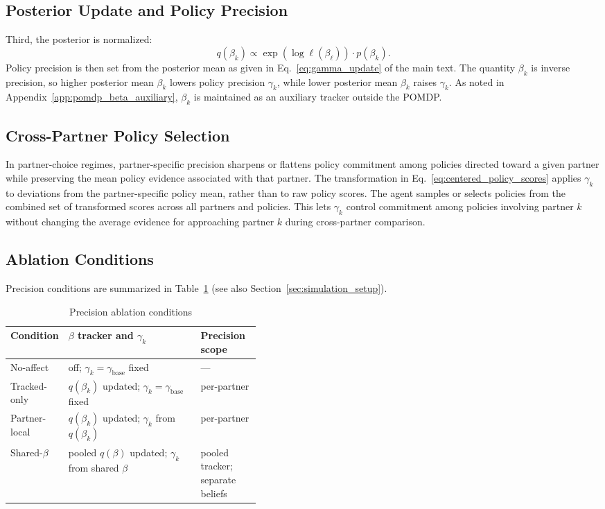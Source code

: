 \documentclass[runningheads,orivec]{llncs}
\begin{document}
\subsection{Posterior Update and Policy Precision}

Third, the posterior is normalized:
\begin{equation}
q(\beta_k) \propto \exp(\log \ell(\beta_\ell)) \cdot p(\beta_k).
\label{eq:posterior_update}
\end{equation}
Policy precision is then set from the posterior mean as given in Eq.~\eqref{eq:gamma_update} of the main text. The quantity $\beta_k$ is inverse precision, so higher posterior mean $\beta_k$ lowers policy precision $\gamma_k$, while lower posterior mean $\beta_k$ raises $\gamma_k$. As noted in Appendix~\ref{app:pomdp_beta_auxiliary}, $\beta_k$ is maintained as an auxiliary tracker outside the POMDP.

\subsection{Cross-Partner Policy Selection}

In partner-choice regimes, partner-specific precision sharpens or flattens policy commitment among policies directed toward a given partner while preserving the mean policy evidence associated with that partner. The transformation in Eq.~\eqref{eq:centered_policy_scores} applies $\gamma_k$ to deviations from the partner-specific policy mean, rather than to raw policy scores. The agent samples or selects policies from the combined set of transformed scores across all partners and policies. This lets $\gamma_k$ control commitment among policies involving partner $k$ without changing the average evidence for approaching partner $k$ during cross-partner comparison.

\subsection{Ablation Conditions}

Precision conditions are summarized in Table~\ref{tab:precision_variants} (see also Section~\ref{sec:simulation_setup}).

\begin{table}[H]
\centering
\small
\caption{Precision ablation conditions}
\label{tab:precision_variants}
\begin{tabularx}{\linewidth}{@{}>{\raggedright\arraybackslash}p{0.18\linewidth}X>{\raggedright\arraybackslash}p{0.24\linewidth}@{}}
\toprule
Condition & $\beta$ tracker and $\gamma_k$ & Precision scope \\
\midrule
No-affect & off; $\gamma_k = \gamma_{\text{base}}$ fixed & --- \\
Tracked-only & $q(\beta_k)$ updated; $\gamma_k = \gamma_{\text{base}}$ fixed & per-partner \\
Partner-local & $q(\beta_k)$ updated; $\gamma_k$ from $q(\beta_k)$ & per-partner \\
Shared-$\beta$ & pooled $q(\beta)$ updated; $\gamma_k$ from shared $\beta$ & pooled tracker; separate beliefs \\
\bottomrule
\end{tabularx}
\end{table}
\end{document}

